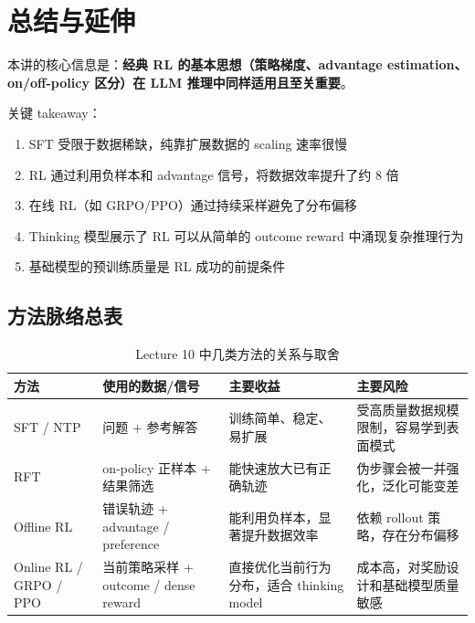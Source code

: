 \section{总结与延伸}

本讲的核心信息是：\textbf{经典 RL 的基本思想（策略梯度、advantage estimation、on/off-policy 区分）在 LLM 推理中同样适用且至关重要}。

关键 takeaway：
\begin{enumerate}
    \item SFT 受限于数据稀缺，纯靠扩展数据的 scaling 速率很慢
    \item RL 通过利用负样本和 advantage 信号，将数据效率提升了约 8 倍
    \item 在线 RL（如 GRPO/PPO）通过持续采样避免了分布偏移
    \item Thinking 模型展示了 RL 可以从简单的 outcome reward 中涌现复杂推理行为
    \item 基础模型的预训练质量是 RL 成功的前提条件
\end{enumerate}

\subsection{方法脉络总表}

\begin{table}[H]
\centering
\begin{tabular}{p{} p{} p{} p{}}
\toprule
方法 & 使用的数据/信号 & 主要收益 & 主要风险 \\
\midrule
SFT / NTP & 问题 + 参考解答 & 训练简单、稳定、易扩展 & 受高质量数据规模限制，容易学到表面模式 \\
RFT & on-policy 正样本 + 结果筛选 & 能快速放大已有正确轨迹 & 伪步骤会被一并强化，泛化可能变差 \\
Offline RL & 错误轨迹 + advantage / preference & 能利用负样本，显著提升数据效率 & 依赖 rollout 策略，存在分布偏移 \\
Online RL / GRPO / PPO & 当前策略采样 + outcome / dense reward & 直接优化当前行为分布，适合 thinking model & 成本高，对奖励设计和基础模型质量敏感 \\
\bottomrule
\end{tabular}
\caption{Lecture 10 中几类方法的关系与取舍}
\end{table}

